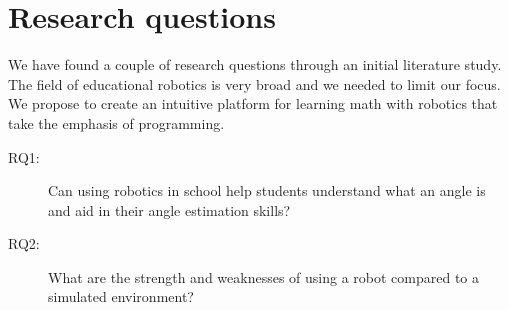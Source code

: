 \chapter{Research questions}
We have found a couple of research questions through an initial literature study. The field of educational robotics is very broad and we needed to limit our focus. We propose to create an intuitive platform for learning math with robotics that take the emphasis of programming.

\begin{description}
	\item[RQ1: ] Can using robotics in school help students understand what an angle is and aid in their angle estimation skills?
	\item[RQ2: ] What are the strength and weaknesses of using a robot compared to a simulated environment?
\end{description}
